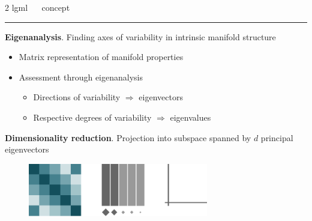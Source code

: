 \documentclass[11pt, compress, t, notes = noshow, xcolor = table, 
aspectratio = 1610]{beamer}
\newcommand{\highlight}[1]{\textcolor{highlightcol}{\textbf{#1}}}
\newcommand{\arritem}{\item[\highlight{$\rightarrow$}]}
\newcommand{\flexitem}[1]{\item[$\highlight{#1}$]}
\begin{document}

\LARGE
\begin{frame}{\textcolor{gray!90}{2 lgml} ~~ concept}
\normalsize
\vspace{-0.5cm}
\noindent \textcolor{gray!90}{\rule{\textwidth}{1pt}}
\smallskip

\textbf{Eigenanalysis}. Finding axes of variability in intrinsic 
manifold structure

\begin{itemize}
  \arritem Matrix representation of manifold properties
  \arritem Assessment through eigenanalysis
  \begin{itemize}
    \arritem Directions of variability $\Rightarrow$ eigenvectors
    \arritem Respective degrees of variability $\Rightarrow$ eigenvalues
  \end{itemize}
\end{itemize}

\vspace{0.3cm}

\textbf{Dimensionality reduction}. Projection into subspace 
spanned by $d$ principal eigenvectors

\vspace{0.3cm}

\begin{figure}[H]
  \raggedright
  \includegraphics[trim = 0 0 0 0, clip, %
    width = 0.7\textwidth]{figures/eigenanalysis}
\end{figure}

\end{frame}


% 
% 
\end{document}
